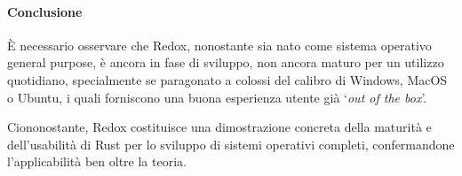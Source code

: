 \paragraph{Conclusione}
È necessario osservare che Redox, nonostante sia nato come sistema operativo general purpose, è ancora in fase di sviluppo, non ancora 
maturo per un utilizzo quotidiano, specialmente se paragonato a colossi del calibro di Windows, MacOS o Ubuntu, i quali forniscono una buona esperienza utente già `\textit{out of the box}'.

Ciononostante, Redox costituisce una dimostrazione concreta della maturità e dell'usabilità di Rust per lo sviluppo di sistemi operativi completi, confermandone
l'applicabilità ben oltre la teoria.